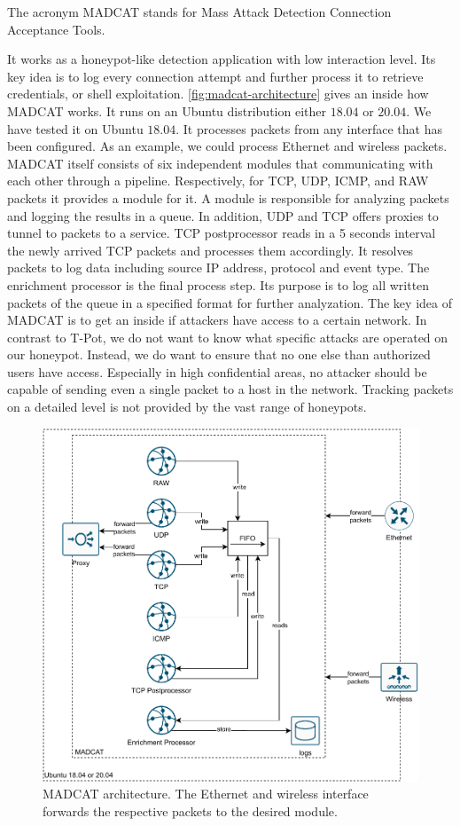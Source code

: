 The acronym MADCAT stands for Mass Attack Detection Connection Acceptance Tools.

It works as a honeypot-like detection application with low interaction level. 
Its key idea is to log every connection attempt and further process it to retrieve credentials, or shell exploitation.
\autoref{fig:madcat-architecture} gives an inside how MADCAT works.
It runs on an Ubuntu distribution either $18.04$ or $20.04$.
We have tested it on Ubuntu $18.04$.
It processes packets from any interface that has been configured.
As an example, we could process Ethernet and wireless packets.
MADCAT itself consists of six independent modules that communicating with each other through a pipeline.
Respectively, for TCP, UDP, ICMP, and RAW packets it provides a module for it.
A module is responsible for analyzing packets and logging the results in a queue.
In addition, UDP and TCP offers proxies to tunnel to packets to a service.
TCP postprocessor reads in a 5 seconds interval the newly arrived TCP packets and processes them accordingly.
It resolves packets to log data including source IP address, protocol and event type.
The enrichment processor is the final process step.
Its purpose is to log all written packets of the queue in a specified format for further analyzation.
The key idea of MADCAT is to get an inside if attackers have access to a certain network.
In contrast to T-Pot, we do not want to know what specific attacks are operated on our honeypot.
Instead, we do want to ensure that no one else than authorized users have access.
Especially in high confidential areas, no attacker should be capable of sending even a single packet to a host in the network.
Tracking packets on a detailed level is not provided by the vast range of honeypots.

\begin{figure}[ht]
    \centering
    \includegraphics[width=\textwidth]{figures/heicat-architecture.pdf}
    \caption[MADCAT architecture]{MADCAT architecture. The Ethernet and wireless interface forwards the respective packets to the desired module.}
    \label{fig:madcat-architecture}
\end{figure}

